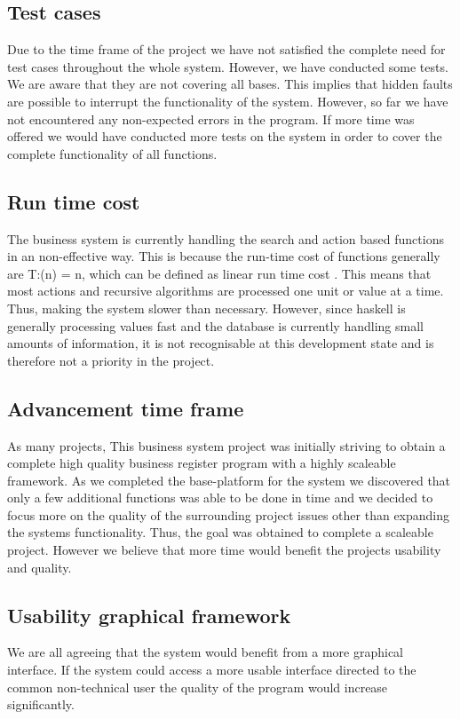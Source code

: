 \documentclass[11pt]{article}
\begin{document}
\subsection{Test cases}
Due to the time frame of the project we have not satisfied the complete need for test cases throughout the whole system. However, we have conducted some tests. We are aware that they are not covering all bases. This implies that hidden faults are possible to interrupt the functionality of the system. However, so far we have not encountered any non-expected errors in the program. If more time was offered we would have conducted more tests on the system in order to cover the complete functionality of all functions.
\subsection{Run time cost}
The business system is currently handling the search and action based functions in an non-effective way. This is because the run-time cost of functions generally are T:(n) = n, which can be defined as linear run time cost . This means that most actions and recursive algorithms are processed one unit or value at a time. Thus, making the system slower than necessary. However, since haskell is generally processing values fast and the database is currently handling small amounts of information, it is not recognisable at this development state and is therefore not a priority in the project.
\subsection{Advancement time frame}
As many projects, This business system project was initially striving to obtain a complete high quality business register program with a highly scaleable framework. As we completed the base-platform for the system we discovered that only a few additional functions was able to be done in time and we decided to focus more on the quality of the surrounding project issues other than expanding the systems functionality. Thus, the goal was obtained to complete a scaleable project. However we believe that more time would benefit the projects usability and quality.
\subsection{Usability graphical framework}
We are all agreeing that the system would benefit from a more graphical interface. If the system could access a more usable interface directed to the common non-technical user the quality of the program would increase significantly.
\end{document}
